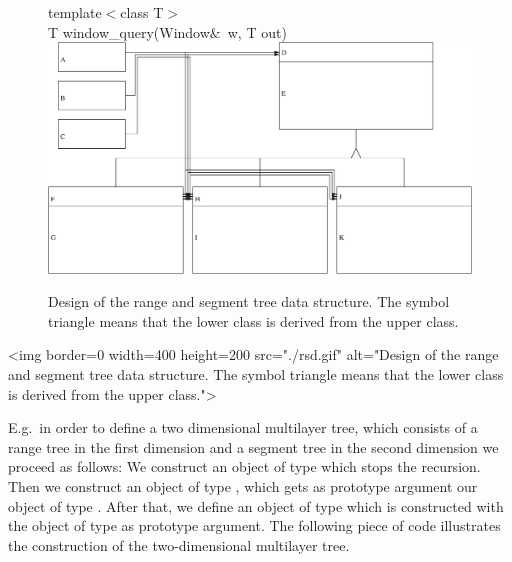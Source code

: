 \begin{ccTexOnly}
\begin{figure}
{{template$<$class T$>$\\
\hspace*{.2cm} T window\_query(Window$\&$~w, T out){}}}
\includegraphics[width=\textwidth,clip]{SearchStructures/rangesegmentdesign.eps}
\caption{\label{rangesegmentdesign} Design of the range and
  segment tree data structure. The symbol triangle means
that the lower class is derived from the upper class. }
\end{figure}
\end{ccTexOnly}

\begin{ccHtmlOnly}
    <img border=0 width=400 height=200 src="./rsd.gif" alt="Design of the range and
  segment tree data structure. The symbol triangle means
that the lower class is derived from the upper class.">
\end{ccHtmlOnly}

E.g.\ in order to define a two dimensional multilayer tree, which
consists of a range tree  in the first dimension and a segment
tree in the second dimension we proceed as follows: We construct
an object of type  which stops the
recursion. Then we construct an object of type ,
which gets as prototype argument our object of type
. After that, we define an object of type
 which is constructed with the object of type
 as prototype argument.
The following piece of code illustrates
the construction of the two-dimensional multilayer tree.

